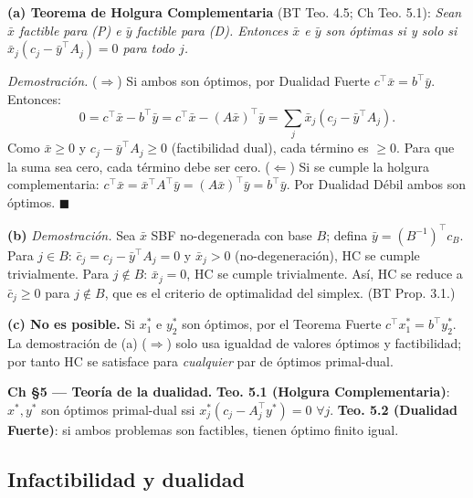 \documentclass[12pt]{article}
\theoremstyle{plain}
\begin{document}
\begin{solucion}

\noindent\textbf{(a) Teorema de Holgura Complementaria} (BT Teo. 4.5; Ch Teo. 5.1): \textit{Sean $\bar{x}$ factible para (P) e $\bar{y}$ factible para (D). Entonces $\bar{x}$ e $\bar{y}$ son óptimas si y solo si $\bar{x}_j(c_j-\bar{y}^\top A_j)=0$ para todo $j$.}

\noindent\textit{Demostración.} ($\Rightarrow$) Si ambos son óptimos, por Dualidad Fuerte $c^\top\bar{x}=b^\top\bar{y}$. Entonces:
\[
0 = c^\top\bar{x} - b^\top\bar{y} = c^\top\bar{x} - (A\bar{x})^\top\bar{y} = \sum_j \bar{x}_j(c_j - \bar{y}^\top A_j).
\]
Como $\bar{x}\geq 0$ y $c_j-\bar{y}^\top A_j\geq 0$ (factibilidad dual), cada término es $\geq 0$. Para que la suma sea cero, cada término debe ser cero. ($\Leftarrow$) Si se cumple la holgura complementaria: $c^\top\bar{x}=\bar{x}^\top A^\top\bar{y}=(A\bar{x})^\top\bar{y}=b^\top\bar{y}$. Por Dualidad Débil ambos son óptimos. $\blacksquare$

\noindent\textbf{(b)} \textit{Demostración.} Sea $\bar{x}$ SBF no-degenerada con base $B$; defina $\bar{y}=(B^{-1})^\top c_B$. Para $j\in B$: $\bar{c}_j=c_j-\bar{y}^\top A_j=0$ y $\bar{x}_j>0$ (no-degeneración), HC se cumple trivialmente. Para $j\notin B$: $\bar{x}_j=0$, HC se cumple trivialmente. Así, HC se reduce a $\bar{c}_j\geq 0$ para $j\notin B$, que es el criterio de optimalidad del simplex. (BT Prop. 3.1.)

\noindent\textbf{(c) No es posible.} Si $x_1^*$ e $y_2^*$ son óptimos, por el Teorema Fuerte $c^\top x_1^*=b^\top y_2^*$. La demostración de (a) ($\Rightarrow$) solo usa igualdad de valores óptimos y factibilidad; por tanto HC se satisface para \emph{cualquier} par de óptimos primal-dual.

\end{solucion}

\begin{teofund}
\textbf{Ch §5 — Teoría de la dualidad.} \textbf{Teo. 5.1 (Holgura Complementaria)}: $x^*,y^*$ son óptimos primal-dual ssi $x^*_j(c_j-A_j^\top y^*)=0$ $\forall j$. \textbf{Teo. 5.2 (Dualidad Fuerte)}: si ambos problemas son factibles, tienen óptimo finito igual.
\end{teofund}

\bigskip

\subsection{Infactibilidad y dualidad}
\end{document}
